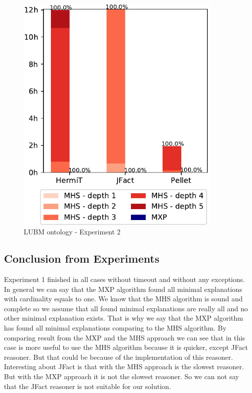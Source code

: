 \documentclass[12pt,a4paper]{article}
\begin{document}
\begin{figure}[H]
	\centering
	\includegraphics[width=10cm]{eval2LUBM} 
	\caption{LUBM ontology - Experiment 2}
	\label{fig:eval2LUBM}
\end{figure}

\subsection{Conclusion from Experiments}
Experiment 1 finished in all cases without timeout and without any exceptions. In general we can say that the MXP algorithm found all minimal explanations with cardinality equals to one. We know that the MHS algorithm is sound and complete so we assume that all found minimal explanations are really all and no other minimal explanation exists. That is why we say that the MXP algorithm has found all minimal explanations comparing to the MHS algorithm. By comparing result from the MXP and the MHS approach we can see that in this case is more useful to use the MHS algorithm because it is quicker, except JFact reasoner. But that could be because of the implementation of this reasoner. Interesting about JFact is that with the MHS approach is the slowest reasoner. But with the MXP approach it is not the slowest reasoner. So we can not say that the JFact reasoner is not suitable for our solution.
\end{document}
